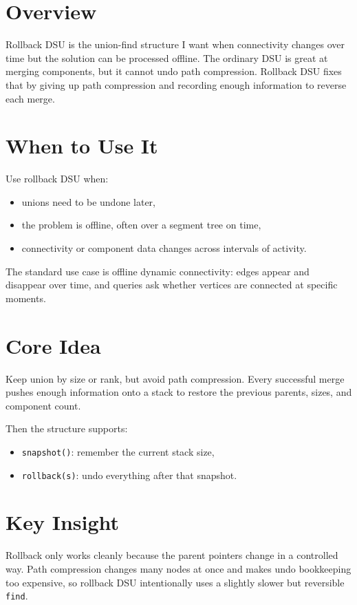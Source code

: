 \section*{Overview}

Rollback DSU is the union-find structure I want when connectivity changes over time but the solution can be processed
offline. The ordinary DSU is great at merging components, but it cannot undo path compression. Rollback DSU fixes that
by giving up path compression and recording enough information to reverse each merge.

\section*{When to Use It}

Use rollback DSU when:

\begin{itemize}
  \item unions need to be undone later,
  \item the problem is offline, often over a segment tree on time,
  \item connectivity or component data changes across intervals of activity.
\end{itemize}

The standard use case is offline dynamic connectivity: edges appear and disappear over time, and queries ask whether
vertices are connected at specific moments.

\section*{Core Idea}

Keep union by size or rank, but avoid path compression. Every successful merge pushes enough information onto a stack to
restore the previous parents, sizes, and component count.

Then the structure supports:
\begin{itemize}
  \item \texttt{snapshot()}: remember the current stack size,
  \item \texttt{rollback(s)}: undo everything after that snapshot.
\end{itemize}

\section*{Key Insight}

Rollback only works cleanly because the parent pointers change in a controlled way. Path compression changes many nodes
at once and makes undo bookkeeping too expensive, so rollback DSU intentionally uses a slightly slower but reversible
\texttt{find}.

